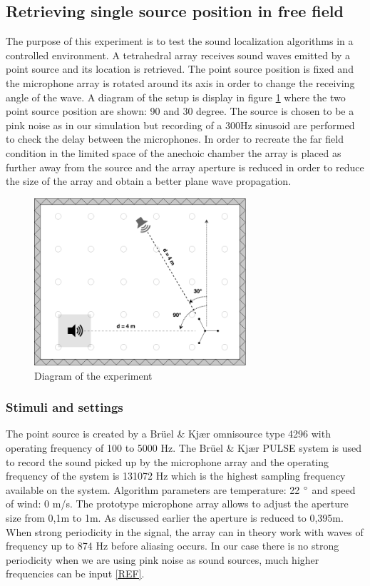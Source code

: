 \subsection{Retrieving single source position in free field}

The purpose of this experiment is to test the sound localization algorithms in a controlled environment. A tetrahedral array receives sound waves emitted by a point source and its location is  retrieved. The point source position is fixed and the microphone array is rotated around its axis in order to change the receiving angle of the wave. A diagram of the setup is display in figure \ref{fig:Anechoic1} where the two point source position are shown: 90 and 30 degree.  The source is chosen to be a pink noise as in our simulation but recording of a 300Hz sinusoid are performed to check the delay between the microphones. In order to recreate the far field condition in the limited space of the anechoic chamber the array is placed as further away from the source and the array aperture is reduced in order to reduce the size of the array and obtain a better plane wave propagation. 

\begin{figure}[H]
    \centering
    \includegraphics[width=0.7\textwidth]{Figures/Anechoicexp1.png}
    \caption{Diagram of the experiment}
    \label{fig:Anechoic1}
\end{figure}
 

\subsubsection{Stimuli and settings}

The point source is created by a Brüel \& Kjær omnisource type 4296 with operating frequency of 100 to 5000 Hz. The Brüel \& Kjær PULSE system is used to record the sound picked up by the microphone array and the operating frequency of the system is 131072 Hz which is the highest sampling frequency available on the system. Algorithm parameters are temperature: 22 $\degree$ and speed of wind: 0 m/s. The prototype microphone array allows to adjust the aperture size from 0,1m to 1m. As discussed earlier the aperture is reduced to 0,395m. When strong periodicity in the signal, the array can in theory work with waves of frequency up to 874 Hz before aliasing occurs. In our case there is no strong periodicity when we are using pink noise as sound sources, much higher frequencies can be input \ref{REF}.


